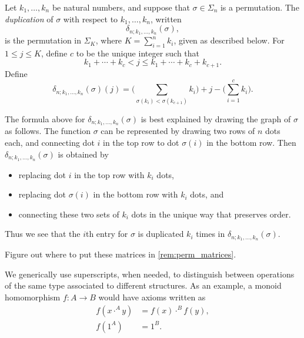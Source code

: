 \begin{Defi}[(Duplication)]\label{Defi:delta-s}
Let $k_1, \ldots, k_n$ be natural numbers, and suppose that $\sigma \in \Sigma_n$ is a permutation. The \emph{duplication} of $\sigma$ with respect to $k_1, \ldots, k_n$, written
\[
\delta_{n; k_1, \ldots, k_n}(\sigma),
\]
is the permutation in $\Sigma_K$, where $K = \sum_{i=1}^n k_i$, given as described below. 
For $1 \leq j \leq K$, define $c$ to be the unique integer such that
\[
k_1 + \cdots + k_c < j \leq k_1 + \cdots + k_c +k_{c+1}.
\]
Define
\[
\delta_{n; k_1, \ldots, k_n}(\sigma)(j) = \big( \sum_{\sigma(k_i) < \sigma(k_{c+1})} k_i\big) + j - \big( \sum_{i=1}^c k_i \big).
\]
\end{Defi}

\begin{rem}\label{rem:delta-s}
The formula above for $\delta_{n; k_1, \ldots, k_n}(\sigma)$ is best explained by drawing the graph of $\sigma$ as follows. The function $\sigma$ can be represented by drawing two rows of $n$ dots each, and connecting dot $i$ in the top row to dot $\sigma(i)$ in the bottom row. Then $\delta_{n; k_1, \ldots, k_n}(\sigma)$ is obtained by 
\begin{itemize}
\item replacing dot $i$ in the top row with $k_i$ dots,
\item replacing dot $\sigma(i)$ in the bottom row with $k_i$ dots, and
\item connecting these two sets of $k_i$ dots in the unique way that preserves order.
\end{itemize}
Thus we see that the $i$th entry for $\sigma$ is duplicated $k_i$ times in $\delta_{n; k_1, \ldots, k_n}(\sigma)$.
\end{rem}

\begin{rem}\label{rem:forward-matrices}
Figure out where to put these matrices in
\cref{rem:perm_matrices}.
\end{rem}

\begin{conv}[(Superscripts)]\label{conv:superscripts}
We generically use superscripts, when needed, to distinguish between operations of the same type associated to different structures. As an example, a monoid homomorphism $f \colon A \to B$ would have axioms written as
\begin{align*}
f(x \cdot^A y) & = f(x) \cdot^B f(y), \\
f(1^A) & = 1^B.
\end{align*}
\end{conv}

